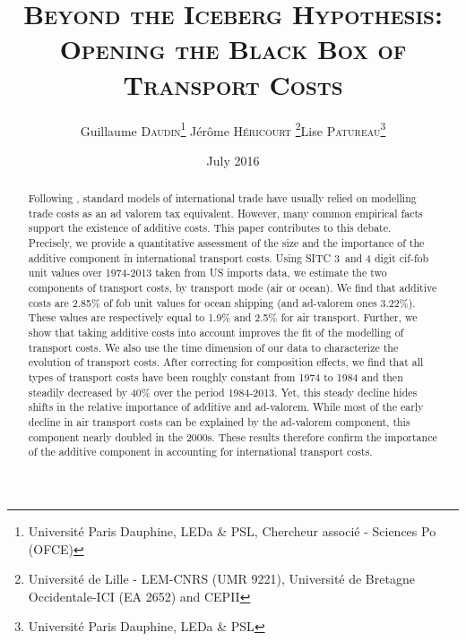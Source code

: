 \documentclass[a4paper,11pt]{article}
\begin{document}
\title{\textsc{Beyond the Iceberg Hypothesis: \\Opening the Black Box of Transport Costs}} %
\author{Guillaume \textsc{Daudin}\thanks{%
Universit\'{e} Paris Dauphine, LEDa \& PSL, Chercheur associ\'{e} - Sciences Po (OFCE)}  \qquad J\'{e}r\^{o}me \textsc{H\'{e}ricourt} \thanks{Universit\'{e} de Lille - LEM-CNRS (UMR 9221), Universit\'{e} de Bretagne Occidentale-ICI (EA 2652) and CEPII}\qquad Lise \textsc{Patureau}\thanks{Universit\'{e} Paris Dauphine, LEDa \& PSL} }
 \maketitle

\date{July 2016}
\bigskip

\begin{abstract}
Following \cite{samuelson1954}, standard models of international trade have usually relied on modelling trade costs as an ad valorem tax equivalent. However, many common empirical facts support the existence of additive costs. This paper contributes to this debate. Precisely, we provide a quantitative assessment of the size and the importance of the additive component in international transport costs. Using SITC 3 and 4 digit cif-fob unit values over 1974-2013 taken from US imports data, we estimate the two components of transport costs, by transport mode (air or ocean). We find that additive costs are 2.85\% of fob unit values for ocean shipping (and ad-valorem ones 3.22\%). These values are respectively equal to 1.9\% and 2.5\% for air transport. Further, we show that taking additive costs into account improves the fit of the modelling of transport costs. We also use the time dimension of our data to characterize the evolution of transport costs. After correcting for composition effects, we find that all types of transport costs have been roughly constant from 1974 to 1984 and then steadily decreased by 40\% over the period 1984-2013. Yet, this steady decline hides shifts in the relative importance of additive and ad-valorem. While most of the early decline in air transport costs can be explained by the ad-valorem component, this component nearly doubled in the 2000s. These results therefore confirm the importance of the additive component in accounting for international transport costs.
\end{abstract}
\end{document}
